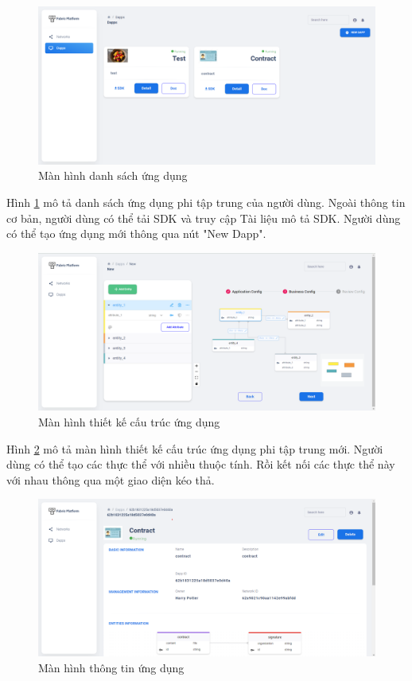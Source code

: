 \documentclass[../DoAn.tex]{subfiles}
\begin{document}
\begin{figure}[H]
    \centering
    \includegraphics[width=0.75\linewidth]{Hinhve/DoAn-ResultDapps.png}
    \caption{Màn hình danh sách ứng dụng}
    \label{fig:ResultDapps}
\end{figure}

Hình \ref{fig:ResultDapps} mô tả danh sách ứng dụng phi tập trung của người
dùng. Ngoài thông tin cơ bản, người dùng có thể tải SDK và truy cập Tài liệu mô
tả SDK. Người dùng có thể tạo ứng dụng mới thông qua nút "New Dapp".

\begin{figure}[H]
    \centering
    \includegraphics[width=0.75\linewidth]{Hinhve/DoAn-ResultDappCreate.png}
    \caption{Màn hình thiết kế cấu trúc ứng dụng}
    \label{fig:ResultDappCreate}
\end{figure}

Hình \ref{fig:ResultDappCreate} mô tả màn hình thiết kế cấu trúc ứng dụng phi
tập trung mới. Người dùng có thể tạo các thực thể với nhiều thuộc tính. Rồi kết
nối các thực thể này với nhau thông qua một giao diện kéo thả.

\begin{figure}[H]
    \centering
    \includegraphics[width=0.75\linewidth]{Hinhve/DoAn-ResultDappDetail.png}
    \caption{Màn hình thông tin ứng dụng}
    \label{fig:ResultDappDetail}
\end{figure}
\end{document}
